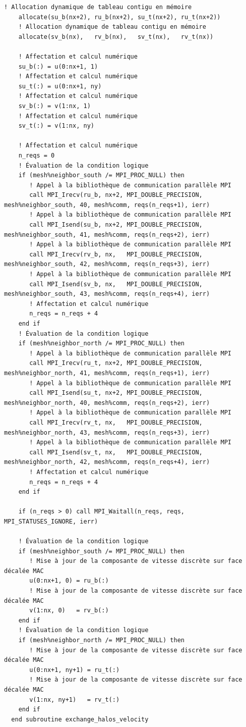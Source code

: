 \documentclass[10pt,a4paper,oneside]{book}
\begin{document}
\begin{lstlisting}[language={[95]Fortran}]
    ! Allocation dynamique de tableau contigu en mémoire
    allocate(su_b(nx+2), ru_b(nx+2), su_t(nx+2), ru_t(nx+2))
    ! Allocation dynamique de tableau contigu en mémoire
    allocate(sv_b(nx),   rv_b(nx),   sv_t(nx),   rv_t(nx))

    ! Affectation et calcul numérique
    su_b(:) = u(0:nx+1, 1)
    ! Affectation et calcul numérique
    su_t(:) = u(0:nx+1, ny)
    ! Affectation et calcul numérique
    sv_b(:) = v(1:nx, 1)
    ! Affectation et calcul numérique
    sv_t(:) = v(1:nx, ny)

    ! Affectation et calcul numérique
    n_reqs = 0
    ! Évaluation de la condition logique
    if (mesh%neighbor_south /= MPI_PROC_NULL) then
       ! Appel à la bibliothèque de communication parallèle MPI
       call MPI_Irecv(ru_b, nx+2, MPI_DOUBLE_PRECISION, mesh%neighbor_south, 40, mesh%comm, reqs(n_reqs+1), ierr)
       ! Appel à la bibliothèque de communication parallèle MPI
       call MPI_Isend(su_b, nx+2, MPI_DOUBLE_PRECISION, mesh%neighbor_south, 41, mesh%comm, reqs(n_reqs+2), ierr)
       ! Appel à la bibliothèque de communication parallèle MPI
       call MPI_Irecv(rv_b, nx,   MPI_DOUBLE_PRECISION, mesh%neighbor_south, 42, mesh%comm, reqs(n_reqs+3), ierr)
       ! Appel à la bibliothèque de communication parallèle MPI
       call MPI_Isend(sv_b, nx,   MPI_DOUBLE_PRECISION, mesh%neighbor_south, 43, mesh%comm, reqs(n_reqs+4), ierr)
       ! Affectation et calcul numérique
       n_reqs = n_reqs + 4
    end if
    ! Évaluation de la condition logique
    if (mesh%neighbor_north /= MPI_PROC_NULL) then
       ! Appel à la bibliothèque de communication parallèle MPI
       call MPI_Irecv(ru_t, nx+2, MPI_DOUBLE_PRECISION, mesh%neighbor_north, 41, mesh%comm, reqs(n_reqs+1), ierr)
       ! Appel à la bibliothèque de communication parallèle MPI
       call MPI_Isend(su_t, nx+2, MPI_DOUBLE_PRECISION, mesh%neighbor_north, 40, mesh%comm, reqs(n_reqs+2), ierr)
       ! Appel à la bibliothèque de communication parallèle MPI
       call MPI_Irecv(rv_t, nx,   MPI_DOUBLE_PRECISION, mesh%neighbor_north, 43, mesh%comm, reqs(n_reqs+3), ierr)
       ! Appel à la bibliothèque de communication parallèle MPI
       call MPI_Isend(sv_t, nx,   MPI_DOUBLE_PRECISION, mesh%neighbor_north, 42, mesh%comm, reqs(n_reqs+4), ierr)
       ! Affectation et calcul numérique
       n_reqs = n_reqs + 4
    end if

    if (n_reqs > 0) call MPI_Waitall(n_reqs, reqs, MPI_STATUSES_IGNORE, ierr)

    ! Évaluation de la condition logique
    if (mesh%neighbor_south /= MPI_PROC_NULL) then
       ! Mise à jour de la composante de vitesse discrète sur face décalée MAC
       u(0:nx+1, 0) = ru_b(:)
       ! Mise à jour de la composante de vitesse discrète sur face décalée MAC
       v(1:nx, 0)   = rv_b(:)
    end if
    ! Évaluation de la condition logique
    if (mesh%neighbor_north /= MPI_PROC_NULL) then
       ! Mise à jour de la composante de vitesse discrète sur face décalée MAC
       u(0:nx+1, ny+1) = ru_t(:)
       ! Mise à jour de la composante de vitesse discrète sur face décalée MAC
       v(1:nx, ny+1)   = rv_t(:)
    end if
  end subroutine exchange_halos_velocity


\end{lstlisting}
\end{document}
